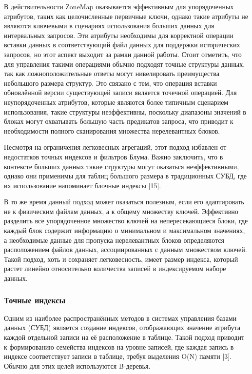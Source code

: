 В действительности ZoneMap оказывается эффективным для упорядоченных атрибутов, таких как целочисленные первичные ключи, однако такие атрибуты не являются ключевыми в сценариях использования больших данных для интервальных запросов. Эти атрибуты необходимы для корректной операции вставки данных в соответствующий файл данных для поддержки исторических запросов, но этот аспект выходит за рамки данной работы. Стоит отметить, что для управления такими операциями обычно подходят точные структуры данных, так как ложноположительные ответы могут нивелировать преимущества небольшого размера структур. Это связано с тем, что операция вставки обновлённой версии существующей записи является точечной операцией. Для неупорядоченных атрибутов, которые являются более типичным сценарием использования, такие структуры неэффективны, поскольку диапазоны значений в блоках могут охватывать большую часть предикатов запроса, что приводит к необходимости полного сканирования множества нерелевантных блоков.

Несмотря на ограничения легковесных агрегаций, этот подход избавлен от недостатков точных индексов и фильтров Блума. Важно заключить, что в контексте больших данных такие структуры могут оказаться неэффективными, однако они применимы для таблиц большого размера в традиционных СУБД, где их использование напоминает блочные индексы [15].

В то же время данный подход может оказаться полезным, если его адаптировать не к физическим файлам данных, а к общему множеству ключей. Эффективно разделить все упорядоченное множество ключей на непересекающиеся блоки, где каждый блок содержит информацию о минимальном и максимальном значениях, а необходимые данные для пропуска нерелевантных блоков определяются расположением файлов данных, ассоциированных с данным множеством ключей. Такой подход, хоть и сохраняет легковесность, имеет размер индекса, который растет линейно относительно количества записей в индексируемом наборе данных.


\subsubsection{Точные индексы} 

Одним из наиболее распространённых методов в системах управления базами данных (СУБД) является создание индексов, отображающих значение атрибута каждой отдельной записи на её расположение в таблице. Такой подход приводит к формированию семейства индексов на уровне записей, где каждая запись в индексе соответствует записи в таблице, требуя выделения O(N) памяти [3]. Обычно для этих целей используются B-деревья.

